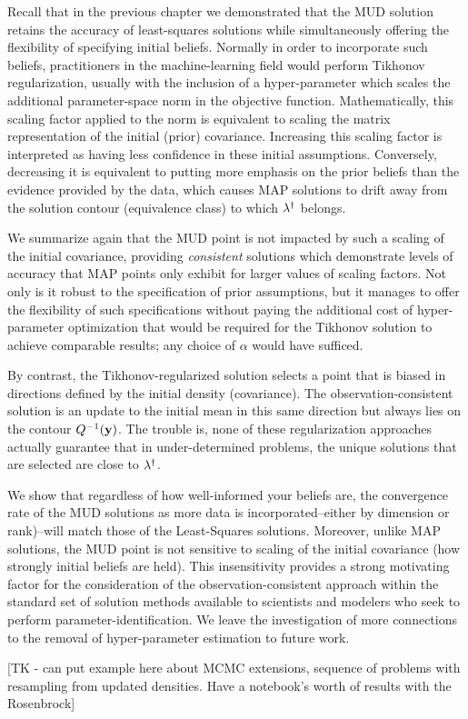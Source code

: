 Recall that in the previous chapter we demonstrated that the MUD solution retains the accuracy of least-squares solutions while simultaneously offering the flexibility of specifying initial beliefs.
Normally in order to incorporate such beliefs, practitioners in the machine-learning field would perform Tikhonov regularization, usually with the inclusion of a hyper-parameter which scales the additional parameter-space norm in the objective function.
Mathematically, this scaling factor applied to the norm is equivalent to scaling the matrix representation of the initial (prior) covariance.
Increasing this scaling factor is interpreted as having less confidence in these initial assumptions.
Conversely, decreasing it is equivalent to putting more emphasis on the prior beliefs than the evidence provided by the data, which causes MAP solutions to drift away from the solution contour (equivalence class) to which $\lambda^\dagger$ belongs.

We summarize again that the MUD point is not impacted by such a scaling of the initial covariance, providing \emph{consistent} solutions which demonstrate levels of accuracy that MAP points only exhibit for larger values of scaling factors.
Not only is it robust to the specification of prior assumptions, but it manages to offer the flexibility of such specifications without paying the additional cost of hyper-parameter optimization that would be required for the Tikhonov solution to achieve comparable results; any choice of $\alpha$ would have sufficed.

By contrast, the Tikhonov-regularized solution selects a point that is biased in directions defined by the initial density (covariance).
The observation-consistent solution is an update to the initial mean in this same direction but always lies on the contour $Q^{-1}(\mathbf{y})$.
The trouble is, none of these regularization approaches actually guarantee that in under-determined problems, the unique solutions that are selected are close to $\lambda^\dagger$.

We show that regardless of how well-informed your beliefs are, the convergence rate of the MUD solutions as more data is incorporated\---either by dimension or rank)\---will match those of the Least-Squares solutions.
Moreover, unlike MAP solutions, the MUD point is not sensitive to scaling of the initial covariance (how strongly initial beliefs are held).
This insensitivity provides a strong motivating factor for the consideration of the observation-consistent approach within the standard set of solution methods available to scientists and modelers who seek to perform parameter-identification.
We leave the investigation of more connections to the removal of hyper-parameter estimation to future work.

[TK - can put example here about MCMC extensions, sequence of problems with resampling from updated densities. Have a notebook's worth of results with the Rosenbrock]


\FloatBarrier
